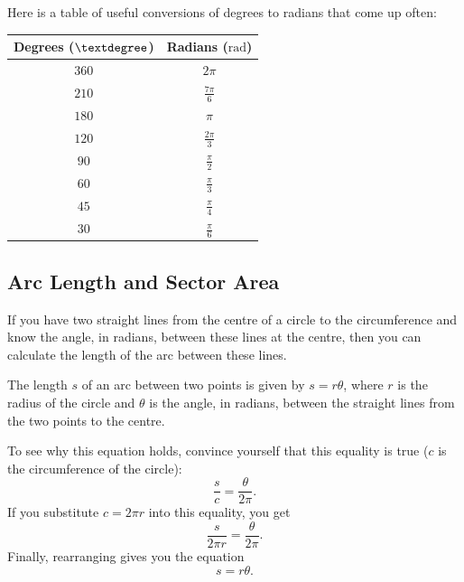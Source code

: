 \documentclass[
  12pt,
  a4paper, oneside]{starmastarticle}
\begin{document}
Here is a table of useful conversions of degrees to radians that come up
often:

\begin{longtable}[]{@{}cc@{}}
\toprule()
Degrees (\(\textdegree\)) & Radians (\(\textrm{rad}\)) \\
\midrule()
\endhead
\(360\) & \(2 \pi\) \\
\(210\) & \(\frac{7\pi}{6}\) \\
\(180\) & \(\pi\) \\
\(120\) & \(\frac{2\pi}{3}\) \\
\(90\) & \(\frac{\pi}{2}\) \\
\(60\) & \(\frac{\pi}{3}\) \\
\(45\) & \(\frac{\pi}{4}\) \\
\(30\) & \(\frac{\pi}{6}\) \\
\bottomrule()
\end{longtable}

\hypertarget{arc-length-and-sector-area}{%
\subsection{Arc Length and Sector
Area}\label{arc-length-and-sector-area}}

If you have two straight lines from the centre of a circle to the
circumference and know the angle, in radians, between these lines at the
centre, then you can calculate the length of the arc between these
lines.

\begin{tcolorbox}[enhanced jigsaw, coltitle=black, rightrule=.15mm, left=2mm, colbacktitle=quarto-callout-note-color!10!white, breakable, arc=.35mm, bottomrule=.15mm, bottomtitle=1mm, toptitle=1mm, title=\textcolor{quarto-callout-note-color}{\faInfo}\hspace{0.5em}{Equation for arc length}, colback=white, leftrule=.75mm, colframe=quarto-callout-note-color-frame, toprule=.15mm, titlerule=0mm, opacityback=0, opacitybacktitle=0.6]
The length \(s\) of an arc between two points is given by
\(s = r \theta\), where \(r\) is the radius of the circle and \(\theta\)
is the angle, in radians, between the straight lines from the two points
to the centre.
\end{tcolorbox}

To see why this equation holds, convince yourself that this equality is
true (\(c\) is the circumference of the circle):
\[\frac{s}{c} = \frac{\theta}{2\pi}.\] If you substitute \(c = 2\pi r\)
into this equality, you get \[\frac{s}{2\pi r} = \frac{\theta}{2\pi}.\]
Finally, rearranging gives you the equation \[s = r \theta.\]
\end{document}
